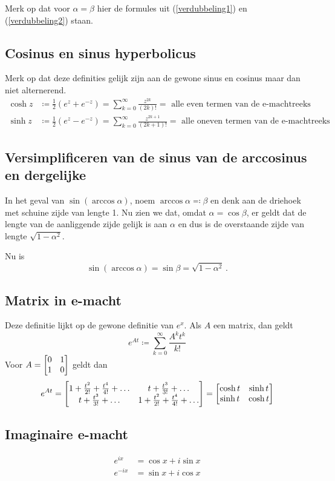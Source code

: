 Merk op dat voor $\alpha = \beta$ hier de formules uit (\ref{verdubbeling1}) en (\ref{verdubbeling2}) staan.



\subsection{Cosinus en sinus hyperbolicus}\label{subsec:cosinusEnSinusHyperbolicus}

Merk op dat deze definities gelijk zijn aan de gewone sinus en cosinus maar dan niet alternerend.
\begin{align*}
    \cosh z &\coloneqq \frac{1}{2} (e^z + e^{-z}) = \sum_{k=0}^\infty \frac{z^{2k}}{(2k)!} = \text{ alle even termen van de e-machtreeks} \\
    \sinh z &\coloneqq \frac{1}{2} (e^z - e^{-z}) = \sum_{k=0}^\infty \frac{z^{2k+1}}{(2k+1)!} = \text{ alle oneven termen van de e-machtreeks}
\end{align*}

\subsection{Versimplificeren van de sinus van de arccosinus en dergelijke}\label{subsec:versimplificerenVanDeSinusVanDeArccosinusEnDergelijke}

In het geval van $\sin (\arccos \alpha)$, noem $\arccos \alpha \eqqcolon \beta$ en denk aan de driehoek met schuine zijde van lengte 1.
Nu zien we dat, omdat $\alpha = \cos \beta$, er geldt dat de lengte van de aanliggende zijde gelijk is aan $\alpha$ en dus is de overstaande zijde van lengte $\sqrt{1-\alpha^2}$.


Nu is
\[ \sin (\arccos \alpha) = \sin \beta = \sqrt{1-\alpha^2}\,. \]
\subsection{Matrix in e-macht}\label{subsec:matrixInE-macht}
Deze definitie lijkt op de gewone definitie van $e^x$.
Als $A$ een matrix, dan geldt
\[ e^{At} \coloneqq \sum_{k=0}^\infty \frac{A^k t^k}{k!} \]
Voor $\displaystyle A = \matrix{0 & 1 \\ 1 & 0}$ geldt dan
\[ e^{At} =
\matrix{1 + \frac{t^2}{2!} + \frac{t^4}{4!} + \dots & t + \frac{t^3}{3!} + \dots \\
t + \frac{t^3}{3!} + \dots & 1 + \frac{t^2}{2!} + \frac{t^4}{4!} + \dots}
= \matrix{\cosh t & \sinh t \\ \sinh t & \cosh t}\]
\subsection{Imaginaire e-macht}\label{subsec:imaginaireE-macht}
\begin{align*}
    e^{ix} &= \cos x + i \sin x \\
    e^{-ix} &= \sin x + i \cos x
\end{align*}